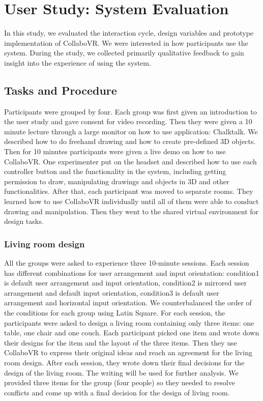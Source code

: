 \documentclass{sigchi}
\begin{document}
\section{User Study: System Evaluation}

In this study, we evaluated the interaction cycle, design variables and prototype implementation of CollaboVR. We were interested in how participants use the system. During the study, we collected primarily qualitative feedback to gain insight into the experience of using the system.

\subsection{Tasks and Procedure}
Participants were grouped by four. Each group was first given an introduction to the user study and gave consent for video recording. Then they were given a 10 minute lecture through a large monitor on how to use application: Chalktalk. We described how to do freehand drawing and how to create pre-defined 3D objects.
Then for 10 minutes participants were given a live demo on how to use CollaboVR. One experimenter put on the headset and described how to use each controller button and the functionality in the system, including getting permission to draw, manipulating drawings and objects in 3D and other functionalities.
After that, each participant was moved to separate rooms. They learned how to use CollaboVR individually until all of them were able to conduct drawing and manipulation. Then they went to the shared virtual environment for design tasks. 

\subsubsection{Living room design}
All the groups were asked to experience three 10-minute sessions. 
Each session has different combinations for user arrangement and input orientation: condition1 is default user arrangement and input orientation, condition2 is mirrored user arrangement and default input orientation, condition3 is default user arrangement and horizontal input orientation.
We counterbalanced the order of the conditions for each group using Latin Square. For each session, the participants were asked to design a living room containing only three items: one table, one chair and one couch. 
Each participant picked one item and wrote down their designs for the item and the layout of the three items. Then they use CollaboVR to express their original ideas and reach an agreement for the living room design. After each session, they wrote down their final decisions for the design of the living room. The writing will be used for further analysis.
We provided three items for the group (four people) so they needed to resolve conflicts and come up with a final decision for the design of living room.
\end{document}
